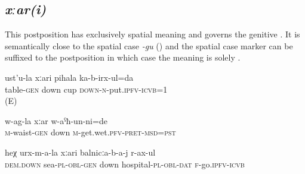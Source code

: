 
\subsection{\textit{xːar(i)} }
\label{ssec:postposition xari}

This postposition has exclusively spatial meaning  and governs the genitive . It is semantically close to the spatial case \textit{-gu} () and the spatial case marker can be suffixed to the postposition in which case the meaning is solely .
%
\begin{exe}
	\ex
	\begin{xlist}
		\ex	\label{I put the cup under the table / to the bottom of the table}
		\gll	ust'u-la	xːari	pihala	ka-b-irx-ul=da  \\
			table-\textsc{gen}	down	cup	\textsc{down-n}-put.\textsc{ipfv}-\textsc{icvb}=1\\
		\glt	{} (E)

		\ex	\label{From the waist down I was wet}
		\gll	 w-ag-la	xːar	w-aˁħ-un-ni=de \\
			\textsc{m}-waist-\textsc{gen}	down	\textsc{m}-get.wet.\textsc{pfv}-\textsc{pret}-\textsc{msd}=\textsc{pst}\\
		\glt	{}

		\ex	\label{I went to the hospital down at the sea}
		\gll	heχ	urx-m-a-la	xːari	balnicːa-b-a-j	r-ax-ul\\
			\textsc{dem.down}	sea-\textsc{pl}-\textsc{obl}-\textsc{gen}	down	hospital-\textsc{pl}-\textsc{obl}-\textsc{dat}	\textsc{f}-go.\textsc{ipfv}-\textsc{icvb}\\
		\glt	{}
	\end{xlist}
\end{exe}



